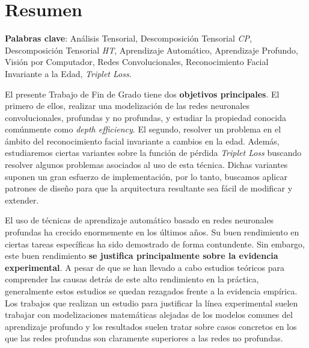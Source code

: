 %



\chapter{Resumen}

\textbf{Palabras clave}: Análisis Tensorial, Descomposición Tensorial \textit{CP}, Descomposición Tensorial \textit{HT}, Aprendizaje Automático, Aprendizaje Profundo, Visión por Computador, Redes Convolucionales, Reconocimiento Facial Invariante a la Edad, \textit{Triplet Loss}.

El presente Trabajo de Fin de Grado tiene dos \textbf{objetivos principales}. El primero de ellos,  realizar una modelización de las redes neuronales convolucionales, profundas y no profundas, y estudiar la propiedad conocida comúnmente como \textit{depth efficiency}. El segundo, resolver un problema en el ámbito del reconocimiento facial invariante a cambios en la edad. Además, estudiaremos ciertas variantes sobre la función de pérdida \textit{Triplet Loss} buscando resolver algunos problemas asociados al uso de esta técnica. Dichas variantes suponen un gran esfuerzo de implementación, por lo tanto, buscamos aplicar patrones de diseño para que la arquitectura resultante sea fácil de modificar y extender.

El uso de técnicas de aprendizaje automático basado en redes neuronales profundas ha crecido enormemente en los últimos años. Su buen rendimiento en ciertas tareas específicas ha sido demostrado de forma contundente. Sin embargo, este buen rendimiento \textbf{se justifica principalmente sobre la evidencia experimental}. A pesar de que se han llevado a cabo estudios teóricos para comprender las causas detrás de este alto rendimiento en la práctica, generalmente estos estudios se quedan rezagados frente a la evidencia empírica. Los trabajos que realizan un estudio para justificar la línea experimental suelen trabajar con modelizaciones matemáticas alejadas de los modelos comunes del aprendizaje profundo y los resultados suelen tratar sobre casos concretos en los que las redes profundas son claramente superiores a las redes no profundas.

